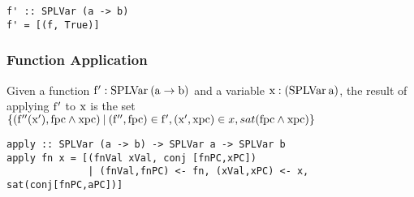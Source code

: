 \documentclass[11pt]{article} %
\begin{document}
\begin{prooftree}
\end{prooftree}

\begin{verbatim}
f' :: SPLVar (a -> b)
f' = [(f, True)]
\end{verbatim}


\subsubsection{Function Application}

Given a function $\var{f'} : \type{SPLVar} \: (\type{a} \to \type{b})$ 
and a variable $\var{x} : (\type{SPLVar} \: \type{a})$, 
the result of applying $\var{f'}$ to $\var{x}$ is the set 
$\{(\var{f''}(\var{x'}), \var{fpc} \wedge \var{xpc}) \: | \: (\var{f''}, \var{fpc}) \in \var{f'}, (\var{x'}, \var{xpc}) \in x, sat(\var{fpc} \wedge \var{xpc})\}$

\begin{prooftree}
\end{prooftree}

\begin{verbatim}
apply :: SPLVar (a -> b) -> SPLVar a -> SPLVar b
apply fn x = [(fnVal xVal, conj [fnPC,xPC]) 
              | (fnVal,fnPC) <- fn, (xVal,xPC) <- x, sat(conj[fnPC,aPC])] 
\end{verbatim}

\end{document}
